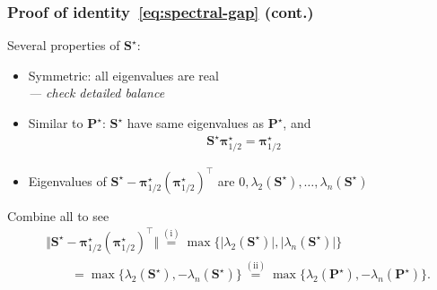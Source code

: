 \documentclass[compress,
mathserif,wide,%
]{beamer}
\begin{document}
\begin{frame}
	\frametitle{Proof of identity~\eqref{eq:spectral-gap} (cont.)}
	Several  properties of $\bm{S}^{\star}$:
	\begin{itemize}
		\item Symmetric: all eigenvalues are real \\
		{\hfill \em --- check detailed balance}
		\item Similar to $\bm{P}^{\star}$: $\bm{S}^{\star}$ have same eigenvalues as $\bm{P}^{\star}$, and 
		\begin{align*}
			\bm{S}^{\star} \bm{\pi}^\star_{1/2} = \bm{\pi}^\star_{1/2}
		\end{align*}
		\item Eigenvalues of $\bm{S}^{\star} -  \bm{\pi}^{\star}_{1/2}(\bm{\pi}^{\star}_{1/2})^{\top}$ are $0, \lambda_{2}(\bm{S}^{\star}), \ldots, \lambda_{n}(\bm{S}^{\star})$
	\end{itemize}
	
	\vfill
	Combine all to see
	\begin{align*}
	& \big\Vert \bm{S}^{\star} - \bm{\pi}^{\star}_{1/2}(\bm{\pi}^{\star}_{1/2})^{\top} \big\Vert
	\overset{(\mathrm{i})}{=} \max \big\{ \big| \lambda_{2}(\bm{S}^{\star}) \big|, \big| \lambda_{n}(\bm{S}^{\star}) \big| \big\}  \\
	& \qquad = \max \big\{ \lambda_{2}(\bm{S}^{\star}),-\lambda_{n}(\bm{S}^{\star}) \big\}
	 \overset{\mathrm{(ii)}}{=}\max\big\{ \lambda_{2}(\bm{P}^{\star}),-\lambda_{n}(\bm{P}^{\star}) \big\} .
\end{align*}
\end{frame}
\end{document}
